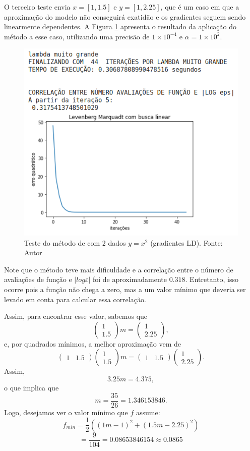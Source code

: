 \documentclass[11pt]{article}
\begin{document}
O terceiro teste envia $x = [1,1.5]$ e $y = [1,2.25]$, que é um caso em que a aproximação do modelo não conseguirá exatidão e os gradientes seguem sendo linearmente dependentes. A Figura \ref{lmbl3} apresenta o resultado da aplicação do método a esse caso, utilizando uma precisão de $1\times10^{-4}$ e $\alpha = 1\times10^{2}$. 

\begin{figure}[H]
\center
\includegraphics[scale=0.7]{Figuras/lmbl3.png}
\caption{Teste do método de  \cite{bmLS} com 2 dados $y = x^2$ (gradientes LD). Fonte: Autor} 
\label{lmbl3}
\end{figure}

Note que o método teve mais dificuldade e a correlação entre o número de avaliações de função e $|log \varepsilon|$ foi de aproximadamente $0.318$. Entretanto, isso ocorre pois a função não chega a zero, mas a um valor mínimo que deveria ser levado em conta para calcular essa correlação.

Assim, para encontrar esse valor, sabemos que
$$\begin{pmatrix}1 \\ 1.5\end{pmatrix}m = \begin{pmatrix}1 \\ 2.25\end{pmatrix},$$
e, por quadrados mínimos, a melhor aproximação vem de
$$\begin{pmatrix}1 & 1.5\end{pmatrix}\begin{pmatrix}1 \\ 1.5\end{pmatrix}m = \begin{pmatrix}1 & 1.5\end{pmatrix}\begin{pmatrix}1 \\ 2.25\end{pmatrix}.$$
Assim,
$$3.25 m = 4.375,$$
o que implica que
$$m = \frac{35}{26} = 1.346153846.$$
Logo, desejamos ver o valor mínimo que $f$ assume:
$$f_{min} = \frac{1}{2}  ((1m - 1)^2 + (1.5m - 2.25)^2 ) $$
$$= \frac{9}{104} = 0.08653846154 \approx 0.0865  $$
\end{document}
